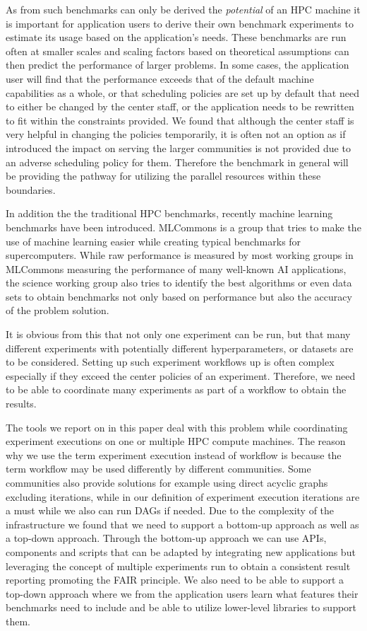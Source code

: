 \documentclass[utf8]{FrontiersinVancouver} %
\begin{document}
As from such benchmarks can only be derived the {\em potential} of an HPC machine it is important for application users to derive their own benchmark experiments to estimate its usage based on the application's needs. These benchmarks are run often at smaller scales and scaling factors based on theoretical assumptions can then predict the performance of larger problems. In some cases, the application user will find that the performance exceeds that of the default machine capabilities as a whole, or that scheduling policies are set up by default that need to either be changed by the center staff, or the application needs to be rewritten to fit within the constraints provided. We found that although the center staff is very helpful in changing the policies temporarily, it is often not an option as if introduced the impact on serving the larger communities is not provided due to an adverse scheduling policy for them. Therefore the benchmark in general will be providing the pathway for utilizing the parallel resources within these boundaries.

In addition the the traditional HPC benchmarks, recently machine learning benchmarks have been introduced. MLCommons is a group that tries to make the use of machine learning easier while creating typical benchmarks for supercomputers. While raw performance is measured by most working groups in MLCommons measuring the performance of many well-known AI applications, the science working group also tries to identify the best algorithms or even data sets to obtain benchmarks not only based on performance but also the accuracy of the problem solution.

It is obvious from this that not only one experiment can be run, but that many different experiments with potentially different hyperparameters, or datasets are to be considered. Setting up such experiment workflows up is often complex especially if they exceed the center policies of an experiment. Therefore, we need to be able to coordinate many experiments as part of a workflow to obtain the results.

The tools we report on in this paper deal with this problem while coordinating experiment executions on one or multiple HPC compute machines.
The reason why we use the term experiment execution instead of workflow is because the term workflow may be used differently by different communities. Some communities also provide solutions for example using direct acyclic graphs excluding iterations, while in our definition of experiment execution iterations are a must while we also can run DAGs if needed. 
Due to the complexity of the infrastructure we found that we need to support a bottom-up approach as well as a top-down approach.
Through the bottom-up approach we can use APIs, components and scripts that can be adapted by integrating new applications but leveraging the concept of multiple experiments run to obtain a consistent result reporting promoting the FAIR principle.
We also need to be able to support a top-down approach where we from the application users learn what features their benchmarks need to include and be able to utilize lower-level libraries to support them.
\end{document}
